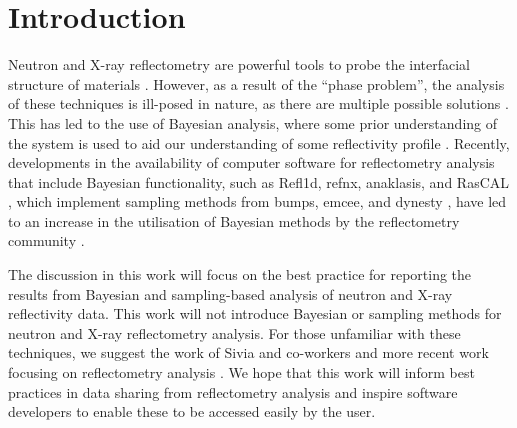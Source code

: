\documentclass[reprint,superscriptaddress,aps,amsmath,linenumbers]{revtex4-2}
\begin{document}
\maketitle

\section{Introduction}
\label{sec:intro}

Neutron and X-ray reflectometry are powerful tools to probe the interfacial structure of materials \cite{lovell_analysis_1999}.
However, as a result of the ``phase problem'', the analysis of these techniques is ill-posed in nature, as there are multiple possible solutions \cite{majkrzak_exact_1995}.
This has led to the use of Bayesian analysis, where some prior understanding of the system is used to aid our understanding of some reflectivity profile \cite{sivia_analysis_1991,geoghegan_experimental_1996,sivia_bayesian_1998}.
Recently, developments in the availability of computer software for reflectometry analysis that include Bayesian functionality, such as Refl1d, refnx, anaklasis, and RasCAL \cite{kienzle_refl1d_2021,nelson_refnx_2019,koutsioubas_anaklasis_2021,hughes_rascal_2019}, which implement sampling methods from bumps, emcee, and dynesty \cite{kienzle_bumps_2021,foremanmackey_emcee_2019,speagle_dynesty_2020}, have led to an increase in the utilisation of Bayesian methods by the reflectometry community \cite{mccluskey_bayesian_2019,mccluskey_general_2020}.

The discussion in this work will focus on the best practice for reporting the results from Bayesian and sampling-based analysis of neutron and X-ray reflectivity data. 
This work will not introduce Bayesian or sampling methods for neutron and X-ray reflectometry analysis. For those unfamiliar with these techniques, we suggest the work of Sivia and co-workers \cite{sivia_bayesian_1998,sivia_data_2006} and more recent work focusing on reflectometry analysis \cite{hughes_physical_2019,mccluskey_general_2020,nelson_refnx_2019,aboljadayel_determining_2021}. 
We hope that this work will inform best practices in data sharing from reflectometry analysis and inspire software developers to enable these to be accessed easily by the user. 
\end{document}
